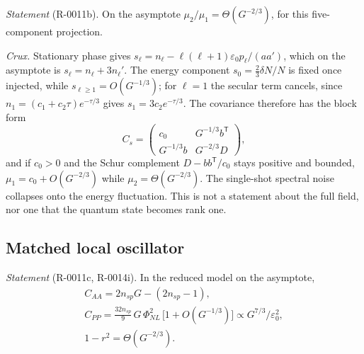 \documentclass[aps,pra,twocolumn,superscriptaddress,nofootinbib,floatfix]{revtex4-2}
\newcommand{\PNL}{\Phi_{NL}}
\newcommand{\nsp}{n_{sp}}
\newcommand{\eps}{\varepsilon_0}
\begin{document}
\textit{Statement} (R-0011b). On the asymptote $\mu_2/\mu_1=\Theta(G^{-2/3})$, for this five-component projection.

\textit{Crux.} Stationary phase gives $s_\ell=n_\ell-\ell(\ell+1)\eps p_\ell/(aa')$, which on the asymptote is
$s_\ell=n_\ell+3n_\ell'$. The energy component $s_0=\frac23\delta N/N$ is fixed once injected, while
$s_{\ell\ge1}=O(G^{-1/3})$; for $\ell=1$ the secular term cancels, since $n_1=(c_1+c_2\tau)e^{-\tau/3}$ gives
$s_1=3c_2e^{-\tau/3}$. The covariance therefore has the block form
\begin{equation}
C_s=\begin{pmatrix}c_0&G^{-1/3}b^{\mathsf T}\\ G^{-1/3}b&G^{-2/3}D\end{pmatrix},\label{eq:schur}
\end{equation}
and if $c_0>0$ and the Schur complement $D-bb^{\mathsf T}/c_0$ stays positive and bounded, $\mu_1=c_0+O(G^{-2/3})$ while
$\mu_2=\Theta(G^{-2/3})$. The single-shot spectral noise collapses onto the energy fluctuation. This is not a statement
about the full field, nor one that the quantum state becomes rank one.

\subsection{Matched local oscillator}

\textit{Statement} (R-0011c, R-0014i). In the reduced model on the asymptote,
\begin{gather}
C_{AA}=2\nsp G-(2\nsp-1),\label{eq:caa}\\
C_{PP}=\tfrac{32\nsp}{9}\,G\,\PNL^2\,\big[1+O(G^{-1/3})\big]\propto G^{7/3}/\eps^2,\label{eq:cpp}\\
1-r^2=\Theta(G^{-2/3}).\label{eq:r2}
\end{gather}
\end{document}
